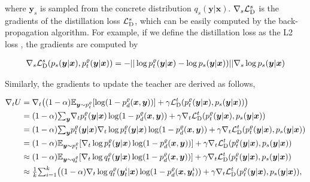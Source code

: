 \documentclass{article}
\newcommand{\OVEC}[1]{\bm{#1}} %
\newcommand{\SVEC}[1]{\bm{#1}} %
\newcommand{\LOSS}[2]{\mathcal{#1}_{\rm{#2}}} %
\newcommand{\EXP}{\mathbb{E}} %
\newcommand{\kdganabbrobj}{U}
\newcommand{\stddistloss}{\LOSS{L}{D}^{s}}
\newcommand{\tchdistloss}{\LOSS{L}{D}^{t}}
\newcommand{\fullpstd}[1]{p_{s}(#1|\OVEC{x})}
\newcommand{\fullqstd}[1]{q_{s}(#1|\OVEC{x})}
\newcommand{\abbrptch}{p_{t}^{\varrho}}
\newcommand{\abbrqtch}{q_{t}^{\varrho}}
\newcommand{\fullptch}[1]{p_{t}^{\varrho}(#1|\OVEC{x})}
\newcommand{\fullqtch}[1]{q_{t}^{\varrho}(#1|\OVEC{x})}
\newcommand{\fullpdis}[1]{p_{d}^{\varrho}(\OVEC{x},#1)}
\begin{document}
where $\SVEC{y}_{s}$ is sampled from the concrete distribution $\fullqstd{\OVEC{y}}$.
$\nabla_{s}\stddistloss$ is the gradients of the distillation loss $\stddistloss$, which can be easily computed by the back-propagation algorithm.
For example, if we define the distillation loss as the L2 loss \cite{ba2014deep}, the gradients are computed by
\begin{small}
\begin{equation*}
\begin{aligned}
\nabla_{s}
\stddistloss(\fullpstd{\OVEC{y}},\fullptch{\OVEC{y}})
=
-
||\log\fullptch{\OVEC{y}}-\log\fullpstd{\OVEC{y}})||
\nabla_{s}\log\fullpstd{\OVEC{y}}
\\
\end{aligned}
\end{equation*}
\end{small}%
Similarly, the gradients to update the teacher are derived as follows,
\begin{small}
\begin{equation*}
\begin{aligned}
\nabla_{t}
\kdganabbrobj
&=
\nabla_{t}
\big(
(1-\alpha)\EXP_{\OVEC{y}\sim\abbrptch}[\log(1-\fullpdis{\OVEC{y}})]
+
\gamma\tchdistloss(\fullptch{\OVEC{y}},\fullpstd{\OVEC{y}})
\big)
\\
&=
(1-\alpha){\textstyle\sum}_{\OVEC{y}}
\nabla_{t}\fullptch{\OVEC{y}}\log(1-\fullpdis{\OVEC{y}})
+
\gamma\nabla_{t}\tchdistloss(\fullptch{\OVEC{y}},\fullpstd{\OVEC{y}})
\\
&=
(1-\alpha){\textstyle\sum}_{\OVEC{y}}
\fullptch{\OVEC{y}}\nabla_{t}\log\fullptch{\OVEC{y}}\log(1-\fullpdis{\OVEC{y}})
+
\gamma\nabla_{t}\tchdistloss(\fullptch{\OVEC{y}},\fullpstd{\OVEC{y}})
\\
&=
(1-\alpha)\EXP_{\OVEC{y}\sim\abbrptch}
[\nabla_{t}\log\fullptch{\OVEC{y}}\log(1-\fullpdis{\OVEC{y}})]
+
\gamma\nabla_{t}\tchdistloss(\fullptch{\OVEC{y}},\fullpstd{\OVEC{y}})
\\
&\approx
(1-\alpha)\EXP_{\OVEC{y}\sim\abbrqtch}
[\nabla_{t}\log\fullqtch{\OVEC{y}}\log(1-\fullpdis{\OVEC{y}})]
+
\gamma\nabla_{t}\tchdistloss(\fullptch{\OVEC{y}},\fullpstd{\OVEC{y}})
\\
&\approx
{\textstyle\frac{1}{k}}
{\textstyle\sum}_{i=1}^{k}
\big(
(1-\alpha)
\nabla_{t}\log\fullqtch{\OVEC{y}^{i}_{t}}
\log(1-\fullpdis{\SVEC{y}^{i}_{t}})
+
\gamma
\nabla_{t}
\tchdistloss(\fullptch{\OVEC{y}},\fullpstd{\OVEC{y}})
\text{,}
\\
\end{aligned}
\end{equation*}
\end{small}%
\end{document}
